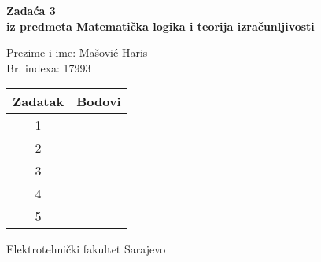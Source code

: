 \documentclass[12pt]{article}
\newcommand{\prezimeIme}{Mašović Haris}
\newcommand{\brIndexa}{17993}
\newcommand{\brZadace}{3}
\begin{document}
    
    \thispagestyle{empty}
    \begin{center}
      \vspace*{1cm}

      \vspace*{2cm}
      {\huge \bf Zadaća \brZadace } \\
      \vspace*{1cm}
      {\Large \bf iz predmeta Matematička logika i teorija izračunljivosti}

      \vspace*{2cm}

      {\Large Prezime i ime: \prezimeIme} \\
      \vspace*{0.75cm}
      {\Large Br. indexa: \brIndexa}

      \vspace*{3cm}
      \renewcommand{\arraystretch}{1.75}
      \begin{tabular}{|c|c|}
    	\hline Zadatak & Bodovi \\
    	\hline 1 &  \\
    	\hline 2 &  \\
    	\hline 3 &  \\
    	\hline 4 &  \\
    	\hline 5 &  \\
    	\hline
     \end{tabular}

      \vfill


      {\large Elektrotehnički fakultet Sarajevo}

    \end{center}
    \newpage
    \thispagestyle{empty}
    
\end{document}

